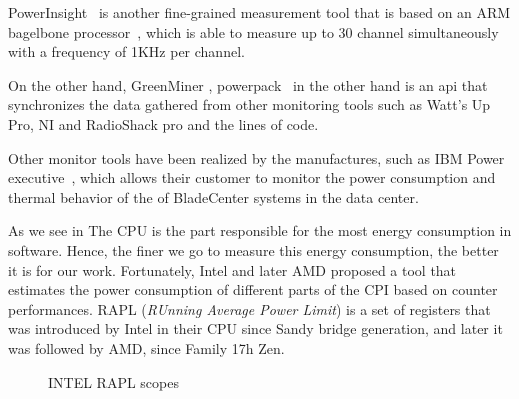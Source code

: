 PowerInsight~\cite{laros2013powerinsight} is another fine-grained measurement tool that is based on an ARM bagelbone processor~\cite{coley2012beaglebone}, which is able to measure up to 30 channel simultaneously with a frequency of 1KHz per channel.

On the other hand, GreenMiner \cite{hindle2014greenminer}, %
powerpack~\cite{ge2009powerpack} in the other hand is an api that synchronizes the data gathered from other monitoring tools such as Watt’s Up Pro, NI and RadioShack pro and the lines of code. %

Other monitor tools have been realized by the manufactures, such as IBM Power executive~\cite{koomey2011growth}, which allows their customer to monitor the power consumption and thermal behavior of the of BladeCenter systems in the data center.




As we see in %
The CPU is the part responsible for the most energy consumption in software. Hence, the finer we go to measure this energy consumption, the better it is for our work.
Fortunately, Intel and later AMD proposed a tool that estimates the power consumption of different parts of the CPI based on counter performances.
RAPL (\emph{RUnning Average Power Limit}) \cite{hackenberg2013power,hackenberg2015energy} is a set of registers that was introduced by Intel in their CPU since Sandy bridge generation, and later it was followed by AMD, since Family 17h Zen.


\begin{figure}[!hbt]
    \caption{INTEL RAPL scopes
    }\label{fig:rapl-domaine}
\end{figure}

